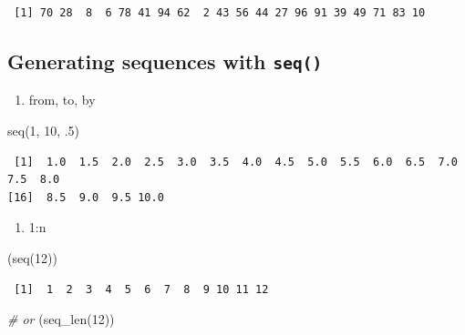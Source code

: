 \documentclass[
]{book}
\newenvironment{Shaded}{\begin{snugshade}}{\end{snugshade}}
\newcommand{\CommentTok}[1]{\textcolor[rgb]{0.56,0.35,0.01}{\textit{#1}}}
\newcommand{\DecValTok}[1]{\textcolor[rgb]{0.00,0.00,0.81}{#1}}
\newcommand{\FunctionTok}[1]{\textcolor[rgb]{0.00,0.00,0.00}{#1}}
\newcommand{\NormalTok}[1]{#1}
\providecommand{\tightlist}{%
  \setlength{\itemsep}{0pt}\setlength{\parskip}{0pt}}
\begin{document}
\begin{verbatim}
 [1] 70 28  8  6 78 41 94 62  2 43 56 44 27 96 91 39 49 71 83 10
\end{verbatim}

\hypertarget{generating-sequences-with-seq}{%
\subsection{\texorpdfstring{Generating sequences with \texttt{seq()}}{Generating sequences with seq()}}\label{generating-sequences-with-seq}}

\begin{enumerate}
\def\labelenumi{\arabic{enumi}.}
\tightlist
\item
  from, to, by
\end{enumerate}

\begin{Shaded}
\begin{Highlighting}[]
\FunctionTok{seq}\NormalTok{(}\DecValTok{1}\NormalTok{, }\DecValTok{10}\NormalTok{, .}\DecValTok{5}\NormalTok{)}
\end{Highlighting}
\end{Shaded}

\begin{verbatim}
 [1]  1.0  1.5  2.0  2.5  3.0  3.5  4.0  4.5  5.0  5.5  6.0  6.5  7.0  7.5  8.0
[16]  8.5  9.0  9.5 10.0
\end{verbatim}

\begin{enumerate}
\def\labelenumi{\arabic{enumi}.}
\setcounter{enumi}{1}
\tightlist
\item
  1:n
\end{enumerate}

\begin{Shaded}
\begin{Highlighting}[]
\NormalTok{(}\FunctionTok{seq}\NormalTok{(}\DecValTok{12}\NormalTok{))}
\end{Highlighting}
\end{Shaded}

\begin{verbatim}
 [1]  1  2  3  4  5  6  7  8  9 10 11 12
\end{verbatim}

\begin{Shaded}
\begin{Highlighting}[]
\CommentTok{\# or }
\NormalTok{(}\FunctionTok{seq\_len}\NormalTok{(}\DecValTok{12}\NormalTok{))}
\end{Highlighting}
\end{Shaded}
\end{document}
